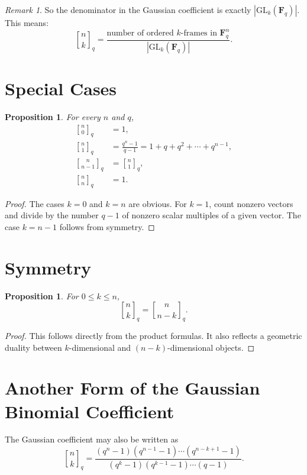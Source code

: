 \documentclass[11pt]{article}
\newtheorem{proposition}[theorem]{Proposition}
\theoremstyle{definition}
\theoremstyle{remark}
\newtheorem{remark}[theorem]{Remark}
\newcommand{\F}{\mathbf{F}}
\newcommand{\GL}{\mathrm{GL}}
\newcommand{\qbinom}[2]{\genfrac{[}{]}{0pt}{}{#1}{#2}_q}
\begin{document}
	\begin{remark}
		So the denominator in the Gaussian coefficient is exactly \(|\GL_k(\F_q)|\). This means:
		\[
		\qbinom{n}{k}
		=
		\frac{\text{number of ordered \(k\)-frames in \(\F_q^n\)}}{|\GL_k(\F_q)|}.
		\]
	\end{remark}
	
	\section{Special Cases}
	
	\begin{proposition}
		For every \(n\) and \(q\),
		\begin{align*}
			\qbinom{n}{0} &= 1,\\
			\qbinom{n}{1} &= \frac{q^n-1}{q-1}=1+q+q^2+\cdots+q^{n-1},\\
			\qbinom{n}{n-1} &= \qbinom{n}{1},\\
			\qbinom{n}{n} &= 1.
		\end{align*}
	\end{proposition}
	
	\begin{proof}
		The cases \(k=0\) and \(k=n\) are obvious. For \(k=1\), count nonzero vectors and divide by the number \(q-1\) of nonzero scalar multiples of a given vector. The case \(k=n-1\) follows from symmetry.
	\end{proof}
	
	\section{Symmetry}
	
	\begin{proposition}
		For \(0\le k\le n\),
		\[
		\qbinom{n}{k}=\qbinom{n}{n-k}.
		\]
	\end{proposition}
	
	\begin{proof}
		This follows directly from the product formulas. It also reflects a geometric duality between \(k\)-dimensional and \((n-k)\)-dimensional objects.
	\end{proof}
	
	\section{Another Form of the Gaussian Binomial Coefficient}
	
	The Gaussian coefficient may also be written as
	\[
	\qbinom{n}{k}
	=
	\frac{(q^n-1)(q^{n-1}-1)\cdots(q^{n-k+1}-1)}
	{(q^k-1)(q^{k-1}-1)\cdots(q-1)}.
	\]
	
\end{document}
